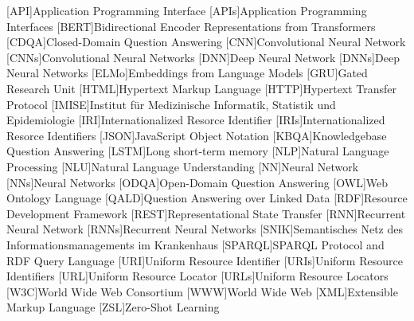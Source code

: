 \begin{acronym}
[API]{Application Programming Interface}
[APIs]{Application Programming Interfaces}
[BERT]{Bidirectional Encoder Representations from Transformers}
[CDQA]{Closed-Domain Question Answering}
[CNN]{Convolutional Neural Network}
[CNNs]{Convolutional Neural Networks}
[DNN]{Deep Neural Network}
[DNNs]{Deep Neural Networks}
[ELMo]{Embeddings from Language Models}
[GRU]{Gated Research Unit}
[HTML]{Hypertext Markup Language}
[HTTP]{Hypertext Transfer Protocol}
[IMISE]{Institut für Medizinische Informatik, Statistik und Epidemiologie}
[IRI]{Internationalized Resorce Identifier}
[IRIs]{Internationalized Resorce Identifiers}
[JSON]{JavaScript Object Notation}
[KBQA]{Knowledgebase Question Answering}
[LSTM]{Long short-term memory}
[NLP]{Natural Language Processing}
[NLU]{Natural Language Understanding}
[NN]{Neural Network}
[NNs]{Neural Networks}
[ODQA]{Open-Domain Question Answering}
[OWL]{Web Ontology Language}
[QALD]{Question Answering over Linked Data}
[RDF]{Resource Development Framework}
[REST]{Representational State Transfer}
[RNN]{Recurrent Neural Network}
[RNNs]{Recurrent Neural Networks}
[SNIK]{Semantisches Netz des Informationsmanagements im Krankenhaus}
[SPARQL]{SPARQL Protocol and RDF Query Language}
[URI]{Uniform Resource Identifier}
[URIs]{Uniform Resource Identifiers}
[URL]{Uniform Resource Locator}
[URLs]{Uniform Resource Locators}
[W3C]{World Wide Web Consortium}
[WWW]{World Wide Web}
[XML]{Extensible Markup Language}
[ZSL]{Zero-Shot Learning}
\end{acronym}
